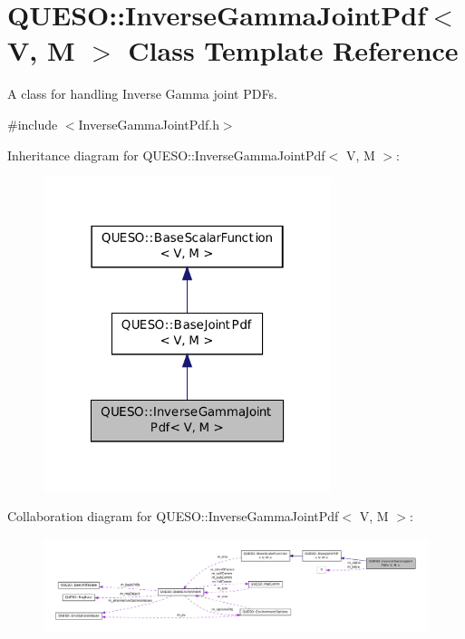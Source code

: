 \hypertarget{class_q_u_e_s_o_1_1_inverse_gamma_joint_pdf}{\section{Q\-U\-E\-S\-O\-:\-:Inverse\-Gamma\-Joint\-Pdf$<$ V, M $>$ Class Template Reference}
\label{class_q_u_e_s_o_1_1_inverse_gamma_joint_pdf}
}


A class for handling Inverse Gamma joint P\-D\-Fs.  




{\ttfamily \#include $<$Inverse\-Gamma\-Joint\-Pdf.\-h$>$}



Inheritance diagram for Q\-U\-E\-S\-O\-:\-:Inverse\-Gamma\-Joint\-Pdf$<$ V, M $>$\-:
\nopagebreak
\begin{figure}[H]
\begin{center}
\leavevmode
\includegraphics[width=238pt]{class_q_u_e_s_o_1_1_inverse_gamma_joint_pdf__inherit__graph}
\end{center}
\end{figure}


Collaboration diagram for Q\-U\-E\-S\-O\-:\-:Inverse\-Gamma\-Joint\-Pdf$<$ V, M $>$\-:
\nopagebreak
\begin{figure}[H]
\begin{center}
\leavevmode
\includegraphics[width=350pt]{class_q_u_e_s_o_1_1_inverse_gamma_joint_pdf__coll__graph}
\end{center}
\end{figure}
